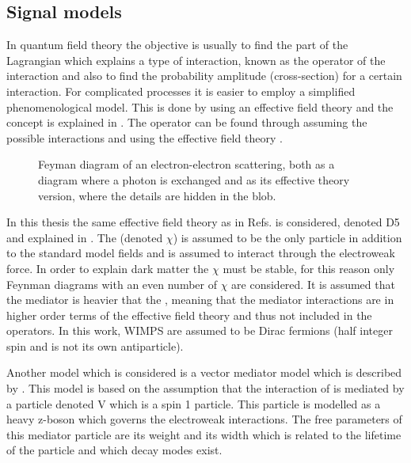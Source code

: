 \subsection{Signal models}\label{sec:tb:subsec:eft}
In quantum field theory the objective is usually to find the part of the Lagrangian which explains a type of interaction, known as the operator of the interaction and also to find the probability amplitude (cross-section) for a certain interaction. For complicated processes it is easier to employ a simplified phenomenological model. This is done by using an effective field theory and the concept is explained in . The operator can be found through assuming the possible interactions and using the effective field theory \citep{Zee:2003}. 
 \begin{figure}[H] %
    \hfill
    \caption{Feyman diagram of an electron-electron scattering, both as a diagram where a photon is exchanged and as its effective theory version, where the details are hidden in the blob.}
    \label{fig:feymanc}
  \end{figure}
In this thesis the same effective field theory as in Refs. \citep{82.116010,Goodman:2010} is considered, denoted D5 and explained in . The \abbrWIMP (denoted $\chi$) is assumed to be the only particle in addition to the standard model fields and is assumed to interact through the electroweak force. In order to explain dark matter the \abbrWIMP $\chi$ must be stable, for this reason only Feynman diagrams with an even number of $\chi$ are considered. It is assumed that the mediator is heavier that the \abbrWIMPS, meaning that the mediator interactions are in higher order terms of the effective field theory and thus not included in the operators. In this work, WIMPS are assumed to be Dirac fermions (half integer spin and is not its own antiparticle). 

Another model which is considered is a vector mediator model which is described by . This model is based on the assumption that the interaction of \abbrWIMPS is mediated by a particle denoted V which is a spin 1 particle. This particle is modelled as a heavy z-boson which governs the electroweak interactions. The free parameters of this mediator particle are its weight and its width which is related to the lifetime of the particle and which decay modes exist. 

